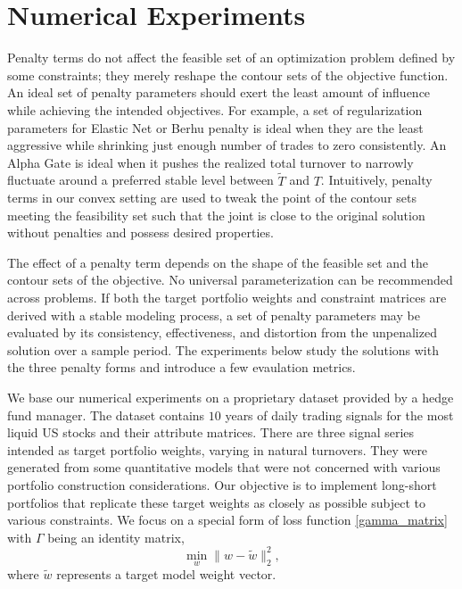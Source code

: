 \documentclass[11pt, letterpaper]{article}
\begin{document}
\section{Numerical Experiments}
\label{sec:experiments}
Penalty terms do not affect the feasible set of an optimization problem defined by some constraints; they merely reshape the
contour sets of the objective function. An ideal set of penalty parameters should exert the least amount of influence while
achieving the intended objectives. For example, a set of regularization parameters for Elastic Net or Berhu penalty is ideal
when they are the least aggressive while shrinking just enough number of trades to zero consistently. An Alpha Gate is ideal
when it pushes the realized total turnover to narrowly fluctuate around a preferred stable level between $\tilde{T}$ and
$T$. Intuitively, penalty terms in our convex setting are used to tweak the point of the contour sets meeting the feasibility
set such that the joint is close to the original solution without penalties and possess desired properties.

The effect of a penalty term depends on the shape of the feasible set and the contour sets of the objective. No universal
parameterization can be recommended across problems. If both the target portfolio weights and constraint matrices are derived
with a stable modeling process, a set of penalty parameters may be evaluated by its consistency, effectiveness, and
distortion from the unpenalized solution over a sample period. The experiments below study the solutions with the three
penalty forms and introduce a few evaulation metrics.

We base our numerical experiments on a proprietary dataset provided by a hedge fund manager. The dataset contains $10$ years of
daily trading signals for the most liquid US stocks and their attribute matrices. There are three signal series intended as
target portfolio weights, varying in natural turnovers. They were generated from some quantitative models that were not
concerned with various portfolio construction considerations. Our objective is to implement long-short portfolios that replicate
these target weights as closely as possible subject to various constraints. We focus on a special form of loss function
\eqref{gamma_matrix} with $\Gamma$ being an identity matrix,
\begin{equation*}
	\underset{w}{\min} \lVert w - \tilde{w}\rVert_2^2,
\end{equation*}
where $\tilde{w}$ represents a target model weight vector.
\end{document}
